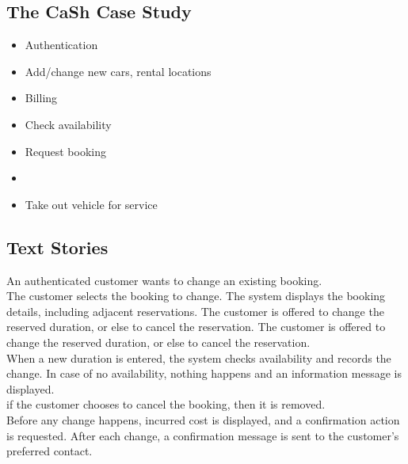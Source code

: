 \subsection{The CaSh Case Study}
\begin{defBox}[title=Main Roles \& Functionalities (from requirements identification)]
    \begin{itemize}
        \item Authentication
    \end{itemize}
    \begin{itemize}
        \item Add/change new cars, rental locations
        \item Billing
    \end{itemize}
    \begin{itemize}
        \item Check availability
        \item Request booking
        \item {}
    \end{itemize}
    \begin{itemize}
        \item Take out vehicle for service
    \end{itemize}
\end{defBox}

\subsection{Text Stories}
\begin{defBox}[title=Change Existing Booking]
    An authenticated customer wants to change an existing booking.\\
    The customer selects the booking to change. The system displays the booking details, including adjacent reservations. The customer is offered to change the reserved duration, or else to cancel the reservation. The customer is offered to change the reserved duration, or else to cancel the reservation.\\
    When a new duration is entered, the system checks availability and records the change. In case of no availability, nothing happens and an information message is displayed.\\
    if the customer chooses to cancel the booking, then it is removed.\\
    Before any change happens, incurred cost is displayed, and a confirmation action is requested. After each change, a confirmation message is sent to the customer's preferred contact.
\end{defBox}
